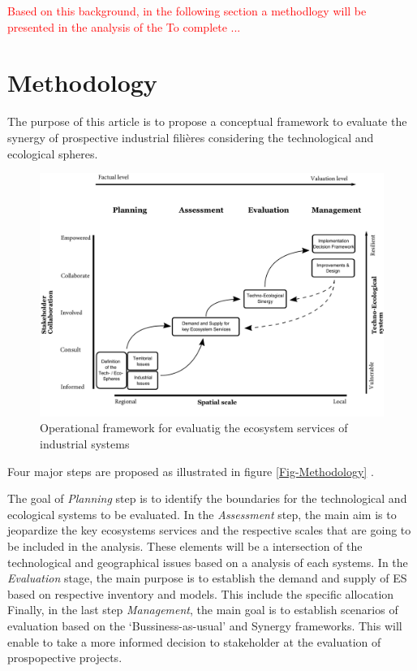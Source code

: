 \documentclass[
  14pt,
]{extarticle}
\begin{document}
\textcolor{red}{
Based on this background, in the following section a methodlogy will be presented in the analysis of the  To complete ...}

\hypertarget{methodology}{%
\section{Methodology}\label{methodology}}

The purpose of this article is to propose a conceptual framework to evaluate the synergy of prospective industrial filières considering the technological and ecological spheres.

\begin{figure}[!ht]

{\centering \includegraphics[width=1\linewidth]{Figures/Methodology} 

}

\caption{Operational framework for evaluatig the ecosystem services of industrial systems}\label{fig:Fig-Methodology}
\end{figure}

Four major steps are proposed as illustrated in figure \ref{Fig-Methodology} .

The goal of \emph{Planning} step is to identify the boundaries for the technological and ecological systems to be evaluated.
In the \emph{Assessment} step, the main aim is to jeopardize the key ecosystems services and the respective scales that are going to be included in the analysis.
These elements will be a intersection of the technological and geographical issues based on a analysis of each systems.
In the \emph{Evaluation} stage, the main purpose is to establish the demand and supply of ES based on respective inventory and models. This include the specific allocation
Finally, in the last step \emph{Management}, the main goal is to establish scenarios of evaluation based on the `Bussiness-as-usual' and Synergy frameworks.
This will enable to take a more informed decision to stakeholder at the evaluation of prospopective projects.
\end{document}

